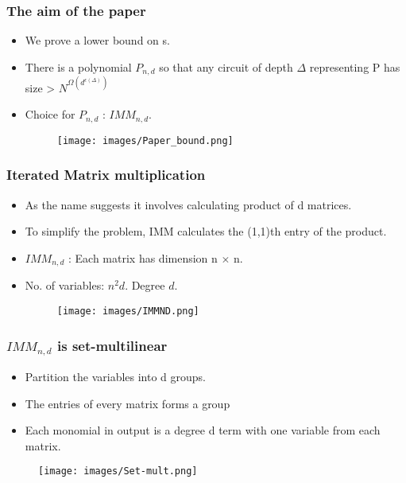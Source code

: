 \documentclass{beamer}
\begin{document}
\begin{frame}[allowframebreaks]
\frametitle{The aim of the paper}
\begin{itemize}
\item We prove a lower bound on s.
\item There is a polynomial $P_{n,d}$ so that any circuit of depth $\Delta$ representing P has size > $N^{\Omega(d^{\epsilon(\Delta)})}$
\item Choice for $P_{n,d}$ : $IMM_{n,d}$.

\begin{figure}
    \centering
    \texttt{[image: images/Paper\_bound.png]}
\end{figure}

\end{itemize}
\end{frame}

\begin{frame}[allowframebreaks]
\frametitle{Iterated Matrix multiplication}
\begin{itemize}
\item As the name suggests it involves calculating product of d matrices.
\item To simplify the problem, IMM calculates the (1,1)th entry of the product.
\item $IMM_{n,d}$ : Each matrix has dimension n $\times$ n.
\item No. of variables: $n^2d$. Degree $d$.

\begin{figure}
    \centering
    \texttt{[image: images/IMMND.png]}
\end{figure}
\end{itemize}
\end{frame}

\begin{frame}[allowframebreaks]
\frametitle{$IMM_{n,d}$ is set-multilinear}
\begin{itemize}
\item Partition the variables into d groups.
\item The entries of every matrix forms a group
\item Each monomial in output is a degree d term with one variable from each matrix.
\end{itemize}
\begin{figure}
    \centering
    \texttt{[image: images/Set-mult.png]}
\end{figure}
\end{frame}
\end{document}
